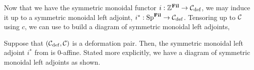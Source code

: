 
\begin{cnstr}\label{cnstr:filt-diagram}
  Now that we have the symmetric monoidal functor $i : \mathbb{Z}^{\operatorname{\mathbf{Fil}}} \to \mathcal{C}_{\mathrm{def}}$, we may induce it up to a
  symmetric monoidal left adjoint,
  $ i^* : \operatorname{\mathrm{Sp}}^{\operatorname{\mathbf{Fil}}} \to \mathcal{C}_{\mathrm{def}} $.
  Tensoring up to $\mathcal{C}$ using $c$, we can use  to build a diagram of symmetric monoidal left adjoints,
  \begin{center}  \end{center}  
  
\end{cnstr}

\begin{prop}\label{prop:filt-mod}
  Suppose that $(\mathcal{C}_{\mathrm{def}}, \mathcal{C})$ is a deformation pair.
  Then, the symmetric monoidal left adjoint $i^*$ from  is $0$-affine.
  Stated more explicitly, we have a diagram of symmetric monoidal left adjoints as shown.
  \begin{center}  \end{center}  
\end{prop}

